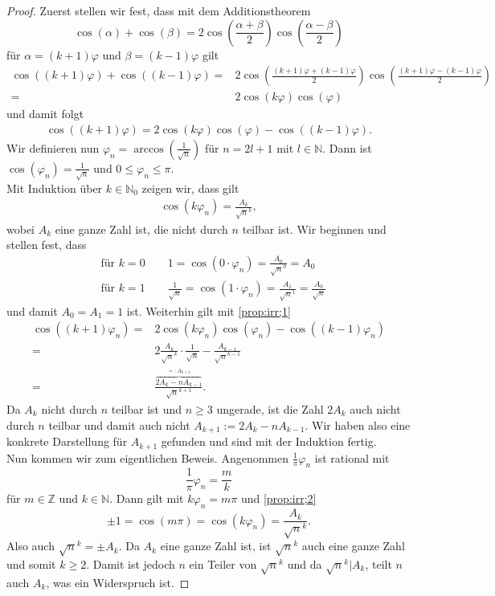 \documentclass[11pt,titlepage]{article}
\newcommand{\setN}{\mathbb{N}}
\newcommand{\setZ}{\mathbb{Z}}
\theoremstyle{definition}
\theoremstyle{remark}
\begin{document}
	\begin{proof}
		Zuerst stellen wir fest, dass mit dem Additionstheorem
		\[\cos(\alpha)+\cos(\beta)=2\cos\left(\frac{\alpha+\beta}{2}\right)\cos\left(\frac{\alpha-\beta}{2}\right) \]
		für $\alpha=(k+1)\varphi$ und $\beta=(k-1)\varphi$ gilt
		\begin{align*}
			\cos\left((k+1)\varphi\right)+\cos\left((k-1)\varphi\right)=&2\cos\left(\frac{(k+1)\varphi+(k-1)\varphi}{2}\right)
			\cos\left(\frac{(k+1)\varphi-(k-1)\varphi}{2}\right) \\
			=& 2\cos(k\varphi)\cos(\varphi)
		\end{align*}
		und damit folgt
		\begin{align}
			\cos((k+1)\varphi)=2\cos(k\varphi)\cos(\varphi)-\cos((k-1)\varphi). \label{prop:irr;1}
		\end{align}
		Wir definieren nun $\varphi_n=\arccos(\frac{1}{\sqrt{n}})$ für $n=2l+1$ mit $l\in\setN$. Dann ist 
		$\cos(\varphi_n)=\frac{1}{\sqrt{n}}$ und $0\leq\varphi_n\leq\pi$. \\
		Mit Induktion über $k\in\setN_0$ zeigen wir, dass gilt
		\begin{align}
			\cos(k\varphi_n)=\frac{A_k}{\sqrt{n}^k}, \label{prop:irr;2}
		\end{align}
		wobei $A_k$ eine ganze Zahl ist, die nicht durch $n$ teilbar ist. Wir beginnen und stellen fest, dass
		\begin{align*}
			&\text{für $k=0$}\qquad 1=\cos(0\cdot\varphi_n)=\frac{A_0}{\sqrt{n}^0}=A_0 \\
			&\text{für $k=1$}\qquad \frac{1}{\sqrt{n}}=\cos({1\cdot\varphi_n})=\frac{A_1}{\sqrt{n}^1}=\frac{A_0}{\sqrt{n}}
		\end{align*}
		und damit $A_0=A_1=1$ ist. Weiterhin gilt mit \ref{prop:irr;1}
		\begin{align*}
			\cos((k+1)\varphi_n)=& 2\cos(k\varphi_n)\cos(\varphi_n) -\cos((k-1)\varphi_n) \\
			=&2\frac{A_k}{\sqrt{n}^k}\cdot\frac{1}{\sqrt{n}}-\frac{A_{k-1}}{\sqrt{n}^{k-1}} \\
			=&\frac{\overbrace{2 A_k-nA_{k-1}}^{=:A_{k+1}}}{\sqrt{n}^{k+1}}.
		\end{align*}
		Da $A_k$ nicht durch $n$ teilbar ist und $n\geq 3$ ungerade, ist die Zahl $2A_k$ auch nicht durch $n$ teilbar 
		und damit auch nicht $A_{k+1}:=2 A_k -nA_{k-1}$. Wir haben also eine konkrete Darstellung für $A_{k+1}$ 
		gefunden und sind mit der Induktion fertig. \\
		Nun kommen wir zum eigentlichen Beweis. Angenommen $\frac{1}{\pi}\varphi_n$ ist 
		rational mit
		\[\frac{1}{\pi}\varphi_n=\frac{m}{k}\]
		für $m\in\setZ$ und $k\in\setN$. Dann gilt mit $k\varphi_n=m\pi$ und \ref{prop:irr;2}
		\[\pm 1=\cos(m\pi)=\cos(k\varphi_n)=\frac{A_k}{\sqrt{n}^k}. \]
		Also auch $\sqrt{n}^k=\pm A_k$. Da $A_k$ eine ganze Zahl ist, ist $\sqrt{n}^k$ auch eine ganze Zahl und somit 
		$k\geq 2$. Damit ist jedoch $n$ ein Teiler von $\sqrt{n}^k$ und da $\sqrt{n}^k \vert A_k$, teilt $n$ auch 
		$A_k$, was ein Widerspruch ist.
	\end{proof}
	
\end{document}
